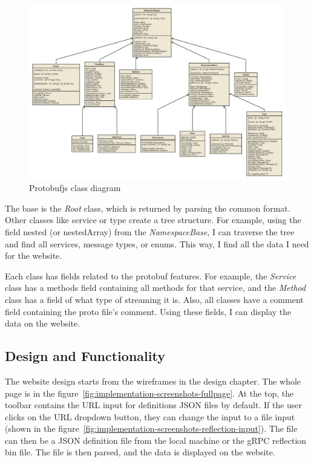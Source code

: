 \begin{landscape}
    \begin{figure}
        \centering
        \captionsetup{justification=centering}
        \includegraphics[width=0.75\paperheight]{images/implementation/protobufjs-class-diagram}
        \caption{Protobufjs class diagram~\cite{protobufjs}}
        \label{fig:protobufjs-class-diagram}
    \end{figure}
\end{landscape}

The base is the \textit{Root} class, which is returned by parsing the common format.
Other classes like service or type create a tree structure.
For example, using the field nested (or nestedArray) from the \textit{NamespaceBase}, I can traverse the tree and find all services, message types, or enums.
This way, I find all the data I need for the website.

Each class has fields related to the protobuf features.
For example, the \textit{Service} class has a methods field containing all methods for that service, and the \textit{Method} class has a field of what type of streaming it is.
Also, all classes have a comment field containing the proto file's comment.
Using these fields, I can display the data on the website.

\subsection{Design and Functionality}
The website design starts from the wireframes in the design chapter.
The whole page is in the figure~\ref{fig:implementation-screenshots-fullpage}.
At the top, the toolbar contains the URL input for definitions JSON files by default.
If the user clicks on the URL dropdown button, they can change the input to a file input (shown in the figure~\ref{fig:implementation-screenshots-reflection-input}).
The file can then be a JSON definition file from the local machine or the gRPC reflection bin file.
The file is then parsed, and the data is displayed on the website.

